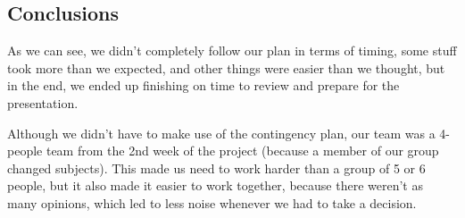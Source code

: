 



 




\pagebreak
\subsection{Conclusions}
As we can see, we didn't completely follow our plan in terms of timing, some stuff took more than we expected, and other things were easier than we thought, but in the end, we ended up finishing on time to review and prepare for the presentation.

Although we didn't have to make use of the contingency plan, our team was a 4-people team from the 2nd week of the project (because a member of our group changed subjects). This made us need to work harder than a group of 5 or 6 people, but it also made it easier to work together, because there weren't as many opinions, which led to less noise whenever we had to take a decision.

